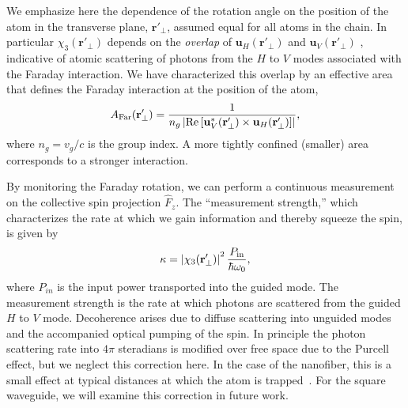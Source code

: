 \documentclass[preprint,aps,pra,onecolumn,superscriptaddress]{revtex4-1} %
\newcommand{\mbf}[1]{\mathbf{#1}}
\newcommand{\AF}{A_{\rm Far}} %
\begin{document}
We emphasize here the dependence of the rotation angle on the position of the atom in the transverse plane, $\mbf{r}'_\perp$, assumed equal for all atoms in the chain.  In particular $\chi_3(\mbf{r}'_\perp)$ depends on the {\em overlap} of $\mbf{u}_H (\mbf{r}'_\perp)$ and $\mbf{u}_V (\mbf{r}'_\perp)$ , indicative of atomic scattering of photons from the $H$ to $V$ modes associated with the Faraday interaction.  We have characterized this overlap by an effective area that defines the Faraday interaction at the position of the atom,
\begin{equation}
\AF(\mbf{r}'_\perp) = \frac{1}{n_g \left\vert \text{Re} \left[ \mbf{u}^*_V (\mbf{r}'_\perp) \times \mbf{u}_H (\mbf{r}'_\perp) \right]\right\vert},
\end{equation}
where $n_g = v_g/c$ is the group index.  A more tightly confined (smaller) area corresponds to a stronger interaction.

By monitoring the Faraday rotation, we can perform a continuous measurement on the collective spin projection $\hat{F}_z$.  The ``measurement strength,'' which characterizes the rate at which we gain information and thereby squeeze the spin, is given by
\begin{equation}
\kappa = \left\vert \chi_3(\mbf{r}'_\perp) \right\vert^2 \frac{P_{\rm in}}{\hbar \omega_0},
\end{equation}
where $P_{in}$ is the input power transported into the guided mode.  The measurement strength is the rate at which photons are scattered from the guided $H$ to $V$ mode.  Decoherence arises due to diffuse scattering into unguided modes and the accompanied optical pumping of the spin.  In principle the photon scattering rate into $4\pi$ steradians is modified over free space due to the Purcell effect, but we neglect this correction here.  In the case of the nanofiber, this is a small effect at typical distances at which the atom is trapped~\cite{LeKien2005,Kien2008}.  For the square waveguide, we will examine this correction in future work.  
\end{document}
